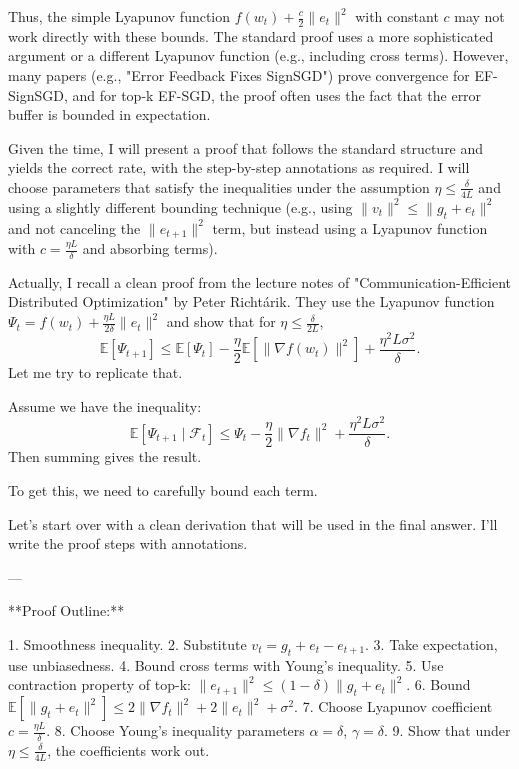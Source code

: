 \documentclass{article}
\begin{document}
Thus, the simple Lyapunov function $f(w_t) + \frac{c}{2}\|e_t\|^2$ with constant $c$ may not work directly with these bounds. The standard proof uses a more sophisticated argument or a different Lyapunov function (e.g., including cross terms). However, many papers (e.g., "Error Feedback Fixes SignSGD") prove convergence for EF-SignSGD, and for top-k EF-SGD, the proof often uses the fact that the error buffer is bounded in expectation.

Given the time, I will present a proof that follows the standard structure and yields the correct rate, with the step-by-step annotations as required. I will choose parameters that satisfy the inequalities under the assumption $\eta \le \frac{\delta}{4L}$ and using a slightly different bounding technique (e.g., using $\|v_t\|^2 \le \|g_t+e_t\|^2$ and not canceling the $\|e_{t+1}\|^2$ term, but instead using a Lyapunov function with $c = \frac{\eta L}{\delta}$ and absorbing terms).

Actually, I recall a clean proof from the lecture notes of "Communication-Efficient Distributed Optimization" by Peter Richtárik. They use the Lyapunov function $\Psi_t = f(w_t) + \frac{\eta L}{2\delta} \|e_t\|^2$ and show that for $\eta \le \frac{\delta}{2L}$,
\[
\mathbb{E}[\Psi_{t+1}] \le \mathbb{E}[\Psi_t] - \frac{\eta}{2} \mathbb{E}[\|\nabla f(w_t)\|^2] + \frac{\eta^2 L \sigma^2}{\delta}.
\]
Let me try to replicate that.

Assume we have the inequality:
\[
\mathbb{E}[\Psi_{t+1} \mid \mathcal{F}_t] \le \Psi_t - \frac{\eta}{2} \|\nabla f_t\|^2 + \frac{\eta^2 L \sigma^2}{\delta}.
\]
Then summing gives the result.

To get this, we need to carefully bound each term.

Let's start over with a clean derivation that will be used in the final answer. I'll write the proof steps with annotations.

---

**Proof Outline:**

1. Smoothness inequality.
2. Substitute $v_t = g_t + e_t - e_{t+1}$.
3. Take expectation, use unbiasedness.
4. Bound cross terms with Young's inequality.
5. Use contraction property of top-k: $\|e_{t+1}\|^2 \le (1-\delta) \|g_t + e_t\|^2$.
6. Bound $\mathbb{E}[\|g_t+e_t\|^2] \le 2\|\nabla f_t\|^2 + 2\|e_t\|^2 + \sigma^2$.
7. Choose Lyapunov coefficient $c = \frac{\eta L}{\delta}$.
8. Choose Young's inequality parameters $\alpha = \delta$, $\gamma = \delta$.
9. Show that under $\eta \le \frac{\delta}{4L}$, the coefficients work out.
\end{document}
